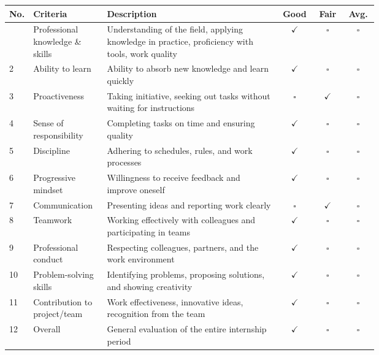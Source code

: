 \documentclass[a4paper,12pt]{article}
\renewcommand{\arraystretch}{1.3}
\begin{document}
\begingroup
\small
\setlength{\tabcolsep}{4pt}
\renewcommand{\arraystretch}{1.2}
\begin{longtable}{@{}p{0.03\linewidth}p{0.20\linewidth}p{0.47\linewidth}ccc@{}}
\toprule
\textbf{No.} & \textbf{Criteria} & \textbf{Description} & \textbf{Good} & \textbf{Fair} & \textbf{Avg.} \\
\midrule
\endhead
\bottomrule
\endfoot
1 & Professional knowledge \& skills & Understanding of the field, applying knowledge in practice, proficiency with tools, work quality & $\checkmark$ & $\square$ & $\square$ \\
2 & Ability to learn & Ability to absorb new knowledge and learn quickly & $\checkmark$ & $\square$ & $\square$ \\
3 & Proactiveness & Taking initiative, seeking out tasks without waiting for instructions & $\square$ & $\checkmark$ & $\square$ \\
4 & Sense of responsibility & Completing tasks on time and ensuring quality & $\checkmark$ & $\square$ & $\square$ \\
5 & Discipline & Adhering to schedules, rules, and work processes & $\checkmark$ & $\square$ & $\square$ \\
6 & Progressive mindset & Willingness to receive feedback and improve oneself & $\checkmark$ & $\square$ & $\square$ \\
7 & Communication & Presenting ideas and reporting work clearly & $\square$ & $\checkmark$ & $\square$ \\
8 & Teamwork & Working effectively with colleagues and participating in teams & $\checkmark$ & $\square$ & $\square$ \\
9 & Professional conduct & Respecting colleagues, partners, and the work environment & $\checkmark$ & $\square$ & $\square$ \\
10 & Problem-solving skills & Identifying problems, proposing solutions, and showing creativity & $\checkmark$ & $\square$ & $\square$ \\
11 & Contribution to project/team & Work effectiveness, innovative ideas, recognition from the team & $\checkmark$ & $\square$ & $\square$ \\
12 & Overall & General evaluation of the entire internship period & $\checkmark$ & $\square$ & $\square$ \\
\end{longtable}
\endgroup


\end{document}
